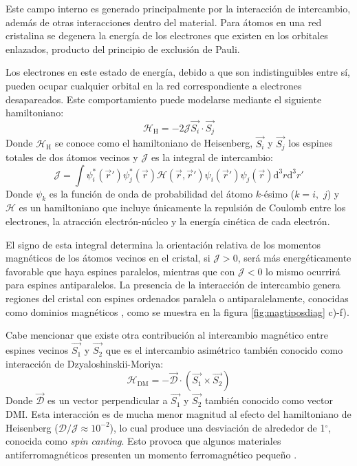 \documentclass[../main.tex]{subfiles}
\begin{document}
Este campo interno es generado principalmente por la interacción de intercambio, además de otras interacciones dentro del material. Para átomos en una red cristalina se degenera la energía de los electrones que existen en los orbitales enlazados, producto del principio de exclusión de Pauli.

Los electrones en este estado de energía, debido a que son indistinguibles entre sí, pueden ocupar cualquier orbital en la red correspondiente a electrones desapareados. Este comportamiento puede modelarse mediante el siguiente hamiltoniano:
\begin{equation}
    \mathcal{H}_\text{H}=-2\mathcal{J}\vec{S_i}\cdot\vec{S_j}
    \label{eq:hamiltonianoheisenberg}
\end{equation}
Donde $\mathcal{H}_\text{H}$ se conoce como el hamiltoniano de Heisenberg, $\vec{S_i}$ y $\vec{S_j}$ los espines totales de dos átomos vecinos y $\mathcal{J}$ es la integral de intercambio:
\begin{equation}
    \mathcal{J}=\int \psi^\ast_i(\vec{r}')\psi^\ast_j(\vec{r})\mathcal{H}(\vec{r},\vec{r}')\psi_i(\vec{r}')\psi_j(\vec{r})\text{d}^3r\text{d}^3r'
    \label{eq:intintercambio}
\end{equation}
Donde $\psi_k$ es la función de onda de probabilidad del átomo $k$-ésimo ($k=i,$ $j$) y $\mathcal{H}$ es un hamiltoniano que incluye únicamente la repulsión de Coulomb entre los electrones, la atracción electrón-núcleo y la energía cinética de cada electrón.

El signo de esta integral determina la orientación relativa de los momentos magnéticos de los átomos vecinos en el cristal, si $\mathcal{J}>0$, será más energéticamente favorable que haya espines paralelos, mientras que con $\mathcal{J}<0$ lo mismo ocurrirá para espines antiparalelos. La presencia de la interacción de intercambio genera regiones del cristal con espines ordenados paralela o antiparalelamente, conocidas como dominios magnéticos \cite{coey2010magnetism}, como se muestra en la figura \ref{fig:magtiposdiag} c)-f).

Cabe mencionar que existe otra contribución al intercambio magnético entre espines vecinos $\vec{S_1}$ y $\vec{S_2}$ que es el intercambio asimétrico también conocido como interacción de Dzyaloshinskii-Moriya:
\begin{equation}
    \mathcal{H}_\text{DM}=-\vec{\mathcal{D}}\cdot\left(\vec{S_1}\times\vec{S_2}\right)
    \label{eq:hamiltonianoDM}
\end{equation}
Donde $\vec{\mathcal{D}}$ es un vector perpendicular a $\vec{S_1}$ y $\vec{S_2}$ también conocido como vector DMI. Esta interacción es de mucha menor magnitud al efecto del hamiltoniano de Heisenberg ($\mathcal{D}/\mathcal{J}\approx10^{-2}$), lo cual produce una desviación de alrededor de 1$^\circ$, conocida como \textit{spin canting}. Esto provoca que algunos materiales antiferromagnéticos presenten un momento ferromagnético pequeño \cite{coey2010magnetism} \cite{Dzyaloshinsky1958}.
\end{document}
